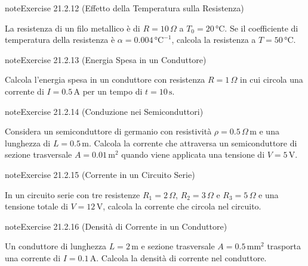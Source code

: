 \documentclass[letterpaper,10pt,italian]{jupyterBook}
\begin{document}
\begin{sphinxadmonition}{note}{Exercise 21.2.12 (Effetto della Temperatura sulla Resistenza)}



\sphinxAtStartPar
La resistenza di un filo metallico è di \(R = 10 \, \Omega\) a \(T_0 = 20 \, \text{°C}\). Se il coefficiente di temperatura della resistenza è \(\alpha = 0.004 \, \text{°C}^{-1}\), calcola la resistenza a \(T = 50 \, \text{°C}\).
\end{sphinxadmonition}
 \label{exercise:ch/electromagnetism/electric-current-problems-exercise-12}

\begin{sphinxadmonition}{note}{Exercise 21.2.13 (Energia Spesa in un Conduttore)}



\sphinxAtStartPar
Calcola l’energia spesa in un conduttore con resistenza \(R = 1 \, \Omega\) in cui circola una corrente di \(I = 0.5 \, \text{A}\) per un tempo di \(t = 10 \, \text{s}\).
\end{sphinxadmonition}
 \label{exercise:ch/electromagnetism/electric-current-problems-exercise-13}

\begin{sphinxadmonition}{note}{Exercise 21.2.14 (Conduzione nei Semiconduttori)}



\sphinxAtStartPar
Considera un semiconduttore di germanio con resistività \(\rho = 0.5 \, \Omega \, \text{m}\) e una lunghezza di \(L = 0.5 \, \text{m}\). Calcola la corrente che attraversa un semiconduttore di sezione trasversale \(A = 0.01 \, \text{m}^2\) quando viene applicata una tensione di \(V = 5 \, \text{V}\).
\end{sphinxadmonition}
 \label{exercise:ch/electromagnetism/electric-current-problems-exercise-14}

\begin{sphinxadmonition}{note}{Exercise 21.2.15 (Corrente in un Circuito Serie)}



\sphinxAtStartPar
In un circuito serie con tre resistenze \(R_1 = 2 \, \Omega\), \(R_2 = 3 \, \Omega\) e \(R_3 = 5 \, \Omega\) e una tensione totale di \(V = 12 \, \text{V}\), calcola la corrente che circola nel circuito.
\end{sphinxadmonition}
 \label{exercise:ch/electromagnetism/electric-current-problems-exercise-15}

\begin{sphinxadmonition}{note}{Exercise 21.2.16 (Densità di Corrente in un Conduttore)}



\sphinxAtStartPar
Un conduttore di lunghezza \(L = 2 \, \text{m}\) e sezione trasversale \(A = 0.5 \, \text{mm}^2\) trasporta una corrente di \(I = 0.1 \, \text{A}\). Calcola la densità di corrente nel conduttore.
\end{sphinxadmonition}
 \label{exercise:ch/electromagnetism/electric-current-problems-exercise-16}
\end{document}
